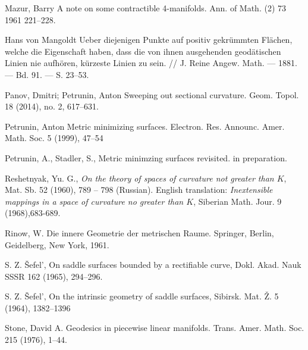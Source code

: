 \begin{thebibliography}{52}
Mazur, Barry A note on some contractible 4-manifolds. Ann. of Math. (2) 73 1961 221--228.

Hans von Mangoldt Ueber diejenigen Punkte auf positiv gekr\"ummten Fl\"achen, welche die Eigenschaft haben, dass die von ihnen ausgehenden geod\"atischen Linien nie aufh\"oren, k\"urzeste Linien zu sein. // J. Reine Angew. Math. --- 1881. --- Bd. 91. --- S. 23--53.

Panov, Dmitri; Petrunin, Anton
Sweeping out sectional curvature. 
Geom. Topol. 18 (2014), no. 2, 617--631. 

 Petrunin, Anton
Metric minimizing surfaces. 
Electron. Res. Announc. Amer. Math. Soc. 5 (1999), 47--54

  Petrunin, A., Stadler, S., 
Metric minimzing surfaces revisited. in preparation.

Reshetnyak, Yu. G.,
\textit{On the theory of spaces of curvature not greater than $K$},
 Mat. Sb. 52 (1960), 789 -- 798 (Russian).
English translation: \textit{Inextensible mappings in a space of curvature
no greater than $K$}, Siberian Math. Jour. 9 (1968),683-689.

Rinow, W. Die innere Geometrie der metrischen Raume. Springer, Berlin, Geidelberg, New York, 1961.

 S. Z. \v{S}efel', On saddle surfaces bounded by a rectifiable curve, Dokl. Akad. Nauk SSSR 162 (1965), 294--296.

 S. Z. \v{S}efel', On the intrinsic geometry of saddle surfaces, Sibirsk. Mat. \v{Z}. 5 (1964), 1382--1396

Stone, David A.
Geodesics in piecewise linear manifolds.
Trans. Amer. Math. Soc. 215 (1976), 1--44.


\end{thebibliography}
